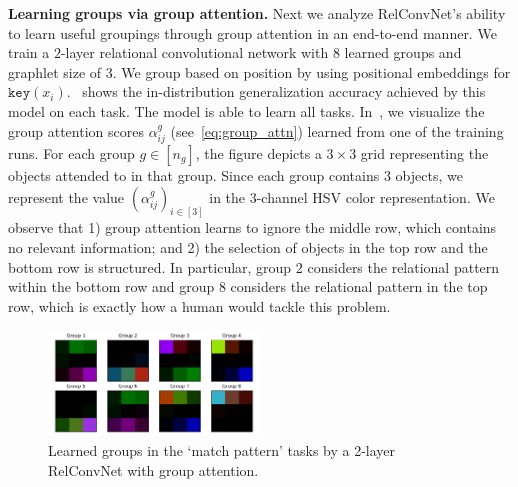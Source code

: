 \textbf{Learning groups via group attention.} Next we analyze RelConvNet's ability to learn useful groupings through group attention in an end-to-end manner. We train a $2$-layer relational convolutional network with $8$ learned groups and graphlet size of $3$. We group based on position by using positional embeddings for $\mathtt{key}(x_i)$.~ shows the in-distribution generalization accuracy achieved by this model on each task. The model is able to learn all tasks. In~, we visualize the group attention scores $\alpha_{ij}^g$ (see~\cref{eq:group_attn}) learned from one of the training runs. For each group $g \in [n_g]$, the figure depicts a $3 \times 3$ grid representing the objects attended to in that group. Since each group contains $3$ objects, we represent the value $(\alpha_{ij}^g)_{i \in [3]}$ in the $3$-channel HSV color representation. We observe that 1) group attention learns to ignore the middle row, which contains no relevant information; and 2) the selection of objects in the top row and the bottom row is structured. In particular, group $2$ considers the relational pattern within the bottom row and group $8$ considers the relational pattern in the top row, which is exactly how a human would tackle this problem.

\begin{figure}
    \centering
    \includegraphics[width=0.5\textwidth]{figs/group_attn_figs/match_patt_group_attn_map.pdf}
    \vskip-10pt
    \caption{Learned groups in the `match pattern' tasks by a 2-layer RelConvNet with group attention.}\label{fig:matchpatt_groupattn}
    \vskip-15pt
\end{figure}
